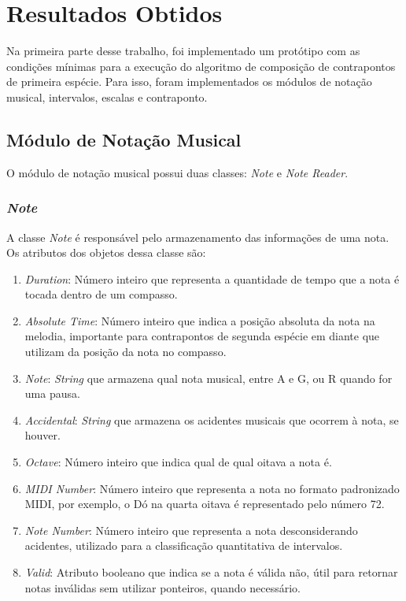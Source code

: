 \chapter[Resultados Obtidos]{Resultados Obtidos}

  Na primeira parte desse trabalho, foi implementado um protótipo com as condições mínimas para a execução do algoritmo de composição de contrapontos de primeira espécie. Para isso, foram implementados os módulos de notação musical, intervalos, escalas e contraponto.

  \section[Módulo de Notação Musical]{Módulo de Notação Musical}

    O módulo de notação musical possui duas classes: \textit{Note} e \textit{Note Reader}.

    \subsection[\textit{Note}]{\textit{Note}}

      A classe \textit{Note} é responsável pelo armazenamento das informações de uma nota. Os atributos dos objetos dessa classe são:

      \begin{enumerate}
        \item \textit{Duration}: Número inteiro que representa a quantidade de tempo que a nota é tocada dentro de um compasso.
        \item \textit{Absolute Time}: Número inteiro que indica a posição absoluta da nota na melodia, importante para contrapontos de segunda espécie em diante que utilizam da posição da nota no compasso.
        \item \textit{Note}: \textit{String} que armazena qual nota musical, entre A e G, ou R quando for uma pausa.
        \item \textit{Accidental}: \textit{String} que armazena os acidentes musicais que ocorrem à nota, se houver.
        \item \textit{Octave}: Número inteiro que indica qual de qual oitava a nota é.
        \item \textit{MIDI Number}: Número inteiro que representa a nota no formato padronizado MIDI, por exemplo, o Dó na quarta oitava é representado pelo número 72.
        \item \textit{Note Number}: Número inteiro que representa a nota desconsiderando acidentes, utilizado para a classificação quantitativa de intervalos.
        \item \textit{Valid}: Atributo booleano que indica se a nota é válida não, útil para retornar notas inválidas sem utilizar ponteiros, quando necessário.
      \end{enumerate}

